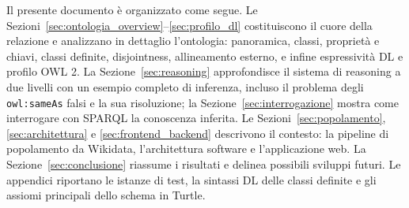 Il presente documento \`e organizzato come segue.
Le Sezioni~\ref{sec:ontologia_overview}--\ref{sec:profilo_dl} costituiscono il cuore
della relazione e analizzano in dettaglio l'ontologia: panoramica, classi, propriet\`a
e chiavi, classi definite, disjointness, allineamento esterno, e infine espressivit\`a
DL e profilo OWL 2.
La Sezione~\ref{sec:reasoning} approfondisce il sistema di reasoning a due livelli con
un esempio completo di inferenza, incluso il problema degli \texttt{owl:sameAs} falsi e
la sua risoluzione; la Sezione~\ref{sec:interrogazione} mostra come interrogare con
SPARQL la conoscenza inferita.
Le Sezioni~\ref{sec:popolamento}, \ref{sec:architettura} e \ref{sec:frontend_backend}
descrivono il contesto: la pipeline di popolamento da Wikidata, l'architettura software
e l'applicazione web.
La Sezione~\ref{sec:conclusione} riassume i risultati e delinea possibili sviluppi futuri.
Le appendici riportano le istanze di test, la sintassi DL delle classi definite e gli
assiomi principali dello schema in Turtle.
